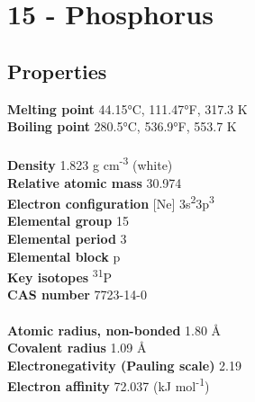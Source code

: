 \section{15 - Phosphorus}
\label{sec:elem-phosphorus}
\subsection{Properties}
\textbf{Melting point} 44.15°C, 111.47°F, 317.3 K\\
\textbf{Boiling point} 280.5°C, 536.9°F, 553.7 K\\
\\
\textbf{Density} 1.823 g cm\textsuperscript{-3} (white)\\
\textbf{Relative atomic mass} 30.974 \\
\textbf{Electron configuration} [Ne] 3s\textsuperscript{2}3p\textsuperscript{3}\\
\textbf{Elemental group} 15\\
\textbf{Elemental period} 3\\
\textbf{Elemental block} p\\
\textbf{Key isotopes} \textsuperscript{31}P\\
\textbf{CAS number} 7723-14-0\\
\\
\textbf{Atomic radius, non-bonded} 1.80 Å\\
\textbf{Covalent radius} 1.09 Å\\
\textbf{Electronegativity (Pauling scale)} 2.19\\
\textbf{Electron affinity} 72.037 (kJ mol\textsuperscript{-1})\\
